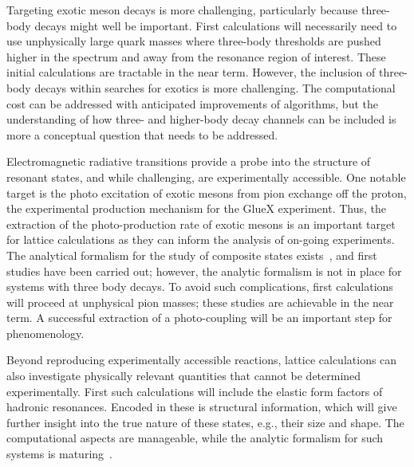 Targeting exotic meson decays is more challenging, particularly because three-body decays might well be important. First calculations will necessarily need to use unphysically large quark masses where three-body thresholds are pushed higher in the spectrum and away from the resonance region of interest.
These initial calculations are tractable in the near term. However, the inclusion of three-body decays within searches for exotics is more challenging. The computational cost can be addressed with anticipated improvements of algorithms, but the understanding of how three- and higher-body decay channels can be included is more a conceptual question that needs to be addressed.


Electromagnetic radiative transitions provide a probe into the structure of resonant states, and while challenging, are experimentally accessible. 
One notable target is the photo excitation of exotic mesons from pion exchange off the proton, the experimental production mechanism for the GlueX experiment. Thus, the extraction of the photo-production rate of exotic mesons is an important target for lattice calculations as they can inform the analysis of on-going experiments. The analytical formalism for the study of composite states exists~\cite{Briceno:2015tza}, and first studies have been carried out; however, the analytic formalism is not in place for systems with three body decays. To avoid such complications, first calculations will proceed at unphysical pion masses;  these studies are achievable in the near term. A successful extraction of a photo-coupling will be an important step for phenomenology.

Beyond reproducing experimentally accessible reactions, lattice calculations can also investigate physically relevant quantities that cannot be determined experimentally. First such calculations will include the elastic form factors of hadronic resonances. Encoded in these is structural information, which will give further insight into the true nature of these states, e.g., their size and shape. The computational aspects are manageable, while the analytic formalism for such systems is maturing~\cite{Briceno:2015tza,Baroni:2018iau}.



